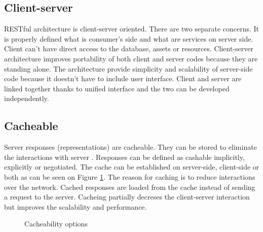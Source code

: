 \subsection{Client-server}

RESTful architecture is client-server oriented. There are two separate concerns. It is properly defined what is consumer's side and what are services on server side. Client can’t have direct access to the database, assets or resources. Client-server architecture improves portability of both client and server codes because they are standing alone. The architecture provide simplicity and scalability of server-side code because it doestn't have to include user interface. Client and server are linked together thanks to unified interface and the two can be developed independently.

\subsection{Cacheable}

Server responses (representations) are cacheable. They can be stored to eliminate the interactions with server . Responses can be defined as cashable implicitly, explicitly or negotiated. The cache can be established on server-side, client-side or both as can be seen on Figure \ref{fig:cacheability}. The reason for caching is to reduce interactions over the network. Cached responses are loaded from the cache instead of sending a request to the server. 
Cacheing partially decreses the client-server interaction but improves the scalability and performance. 


\begin{figure}[htp] 
\caption{Cacheability options}
\label{fig:cacheability}
\end{figure} 

